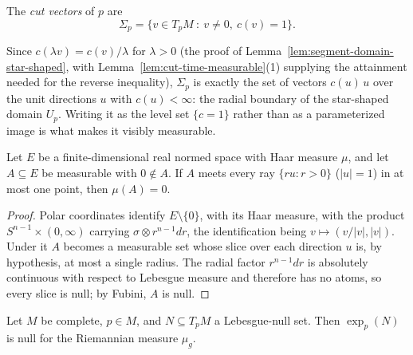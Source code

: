 \begin{definition}
\label{def:cut-vectors}
\leanok
The \emph{cut vectors} of $p$ are
$$\Sigma_p=\{v\in T_pM\ :\ v\neq0,\ c(v)=1\}.$$
\end{definition}

Since $c(\lambda v)=c(v)/\lambda$ for $\lambda>0$ (the proof of
Lemma~\ref{lem:segment-domain-star-shaped}, with
Lemma~\ref{lem:cut-time-measurable}(1) supplying the attainment needed
for the reverse inequality), $\Sigma_p$ is exactly the set of vectors
$c(u)\,u$ over the unit directions $u$ with $c(u)<\infty$: the radial
boundary of the star-shaped domain $U_p$. Writing it as the level set
$\{c=1\}$ rather than as a parameterized image is what makes it
visibly measurable.

\begin{lemma}
\label{lem:radial-graph-null}
\leanok
Let $E$ be a finite-dimensional real normed space with Haar measure
$\mu$, and let $A\subseteq E$ be measurable with $0\notin A$. If $A$
meets every ray $\{ru : r>0\}$ ($\lvert u\rvert=1$) in at most one
point, then $\mu(A)=0$.
\end{lemma}

\begin{proof}
\leanok
Polar coordinates identify $E\setminus\{0\}$, with its Haar measure,
with the product $S^{n-1}\times(0,\infty)$ carrying
$\sigma\otimes r^{n-1}dr$, the identification being $v\mapsto
(v/\lvert v\rvert,\lvert v\rvert)$. Under it $A$ becomes a measurable
set whose slice over each direction $u$ is, by hypothesis, at most a
single radius. The radial factor $r^{n-1}dr$ is absolutely continuous
with respect to Lebesgue measure and therefore has no atoms, so every
slice is null; by Fubini, $A$ is null.
\end{proof}

\begin{lemma}
\label{lem:exp-preserves-null}
\leanok
Let $M$ be complete, $p\in M$, and $N\subseteq T_pM$ a Lebesgue-null
set. Then $\exp_p(N)$ is null for the Riemannian measure $\mu_g$.
\end{lemma}

